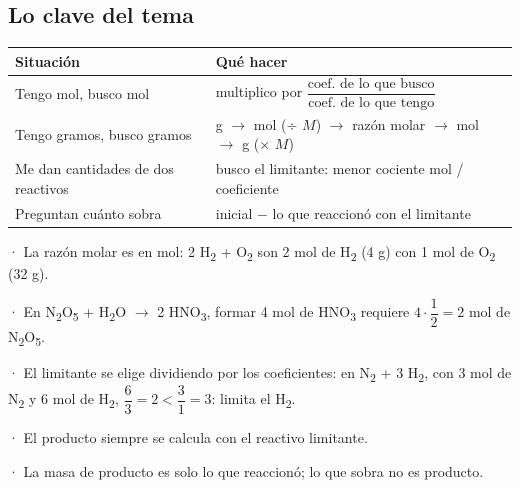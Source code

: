 \subsection{Lo clave del tema}
\begin{center}\small
\begin{tabularx}{\linewidth}{@{}>{\raggedright\arraybackslash\hsize=0.92\hsize}X>{\raggedright\arraybackslash\hsize=1.08\hsize}X@{}}
\toprule
\textbf{Situación} & \textbf{Qué hacer} \\
\midrule
Tengo mol, busco mol & multiplico por $\dfrac{\text{coef. de lo que busco}}{\text{coef. de lo que tengo}}$ \\
Tengo gramos, busco gramos & g \ensuremath{\rightarrow} mol (÷ $M$) \ensuremath{\rightarrow} razón molar \ensuremath{\rightarrow} mol \ensuremath{\rightarrow} g (× $M$) \\
Me dan cantidades de dos reactivos & busco el limitante: menor cociente mol / coeficiente \\
Preguntan cuánto sobra & inicial \ensuremath{-} lo que reaccionó con el limitante \\
\bottomrule
\end{tabularx}
\end{center}
 
\begin{clave}[{Recuerda}] · La razón molar es en mol: 2 H\textsubscript{2} + O\textsubscript{2} son 2 mol de H\textsubscript{2} (4 g) con 1 mol de O\textsubscript{2} (32 g).\par · En N\textsubscript{2}O\textsubscript{5} + H\textsubscript{2}O \ensuremath{\rightarrow} 2 HNO\textsubscript{3}, formar 4 mol de HNO\textsubscript{3} requiere $4\cdot\dfrac{1}{2} = 2$ mol de N\textsubscript{2}O\textsubscript{5}.\par · El limitante se elige dividiendo por los coeficientes: en N\textsubscript{2} + 3 H\textsubscript{2}, con 3 mol de N\textsubscript{2} y 6 mol de H\textsubscript{2}, $\dfrac{6}{3} = 2 < \dfrac{3}{1} = 3$: limita el H\textsubscript{2}.\par · El producto siempre se calcula con el reactivo limitante.\par · La masa de producto es solo lo que reaccionó; lo que sobra no es producto.\end{clave}
 
